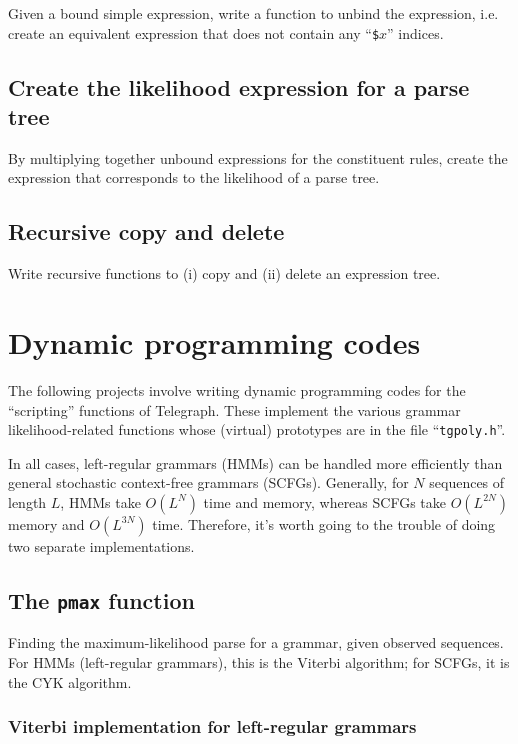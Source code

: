 \documentclass{article}
\begin{document}
Given a bound simple expression, write a function to unbind the
expression, i.e. create an equivalent expression
that does not contain any ``{\tt \$}$x$'' indices.

\subsection{Create the likelihood expression for a parse tree}

By multiplying together unbound expressions for the constituent rules,
create the expression that corresponds to the likelihood of
a parse tree.

\subsection{Recursive copy and delete}

Write recursive functions to (i) copy and (ii) delete an expression tree.

\section{Dynamic programming codes}

The following projects involve writing dynamic programming codes
for the ``scripting'' functions of Telegraph.
These implement the various grammar likelihood-related
functions whose (virtual) prototypes are in the file ``{\tt tgpoly.h}''.

In all cases, left-regular grammars (HMMs) can be handled more efficiently than
general stochastic context-free grammars (SCFGs).
Generally, for $N$ sequences of length $L$,
HMMs take $O(L^N)$ time and memory,
whereas SCFGs take $O(L^{2N})$ memory and $O(L^{3N})$ time.
Therefore, it's worth going to the trouble of doing two separate
implementations.

\subsection{The {\tt pmax} function}

Finding the maximum-likelihood parse for a grammar,
given observed sequences.
For HMMs (left-regular grammars), this is the Viterbi algorithm;
for SCFGs, it is the CYK algorithm.

\subsubsection{Viterbi implementation for left-regular grammars}
\end{document}
